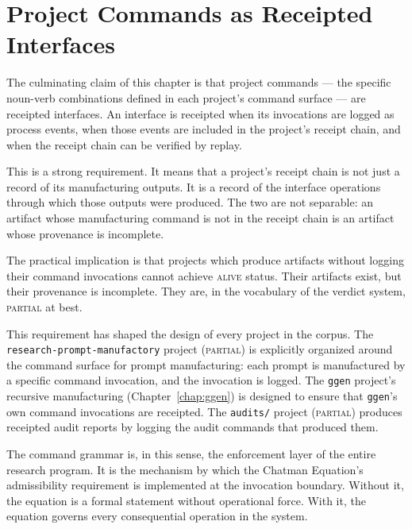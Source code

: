 \section{Project Commands as Receipted Interfaces}

The culminating claim of this chapter is that project commands --- the specific noun-verb combinations defined in each project's command surface --- are receipted interfaces. An interface is receipted when its invocations are logged as process events, when those events are included in the project's receipt chain, and when the receipt chain can be verified by replay.

This is a strong requirement. It means that a project's receipt chain is not just a record of its manufacturing outputs. It is a record of the interface operations through which those outputs were produced. The two are not separable: an artifact whose manufacturing command is not in the receipt chain is an artifact whose provenance is incomplete.

The practical implication is that projects which produce artifacts without logging their command invocations cannot achieve \textsc{alive} status. Their artifacts exist, but their provenance is incomplete. They are, in the vocabulary of the verdict system, \textsc{partial} at best.

This requirement has shaped the design of every project in the corpus. The \texttt{research-prompt-manufactory} project (\textsc{partial}) is explicitly organized around the command surface for prompt manufacturing: each prompt is manufactured by a specific command invocation, and the invocation is logged. The \texttt{ggen} project's recursive manufacturing (Chapter~\ref{chap:ggen}) is designed to ensure that \texttt{ggen}'s own command invocations are receipted. The \texttt{audits/} project (\textsc{partial}) produces receipted audit reports by logging the audit commands that produced them.

The command grammar is, in this sense, the enforcement layer of the entire research program. It is the mechanism by which the Chatman Equation's admissibility requirement is implemented at the invocation boundary. Without it, the equation is a formal statement without operational force. With it, the equation governs every consequential operation in the system.

